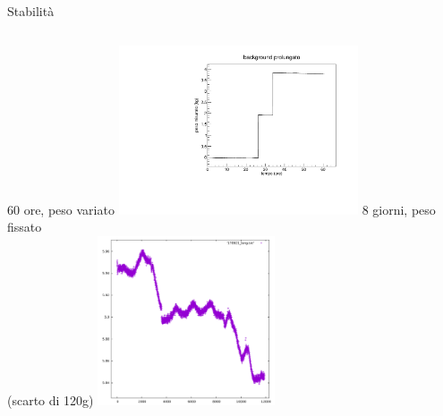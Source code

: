 \documentclass{beamer}
\begin{document}
\begin{frame}{Stabilit\`a}
  \begin{columns}[c]
      \large{60 ore, peso variato}
      \includegraphics[height=5cm]{../../analisi_dati/background/60h}
      \large{8 giorni, peso fissato}
      \\\small{(scarto di 120g)}
      \includegraphics[height=5cm]{../../analisi_dati/background/8gg}
    \end{columns}
\end{frame}
\end{document}
